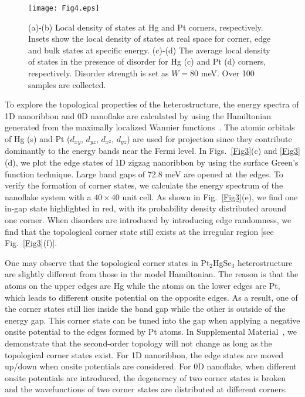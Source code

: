 \documentclass[aps,prl,twocolumn,showpacs,superscriptaddress]{revtex4-1}
\begin{document}
\begin{figure}
  \texttt{[image: Fig4.eps]}
  \caption{(a)-(b) Local density of states at Hg and Pt corners, respectively. Insets show the local density of states at real space for corner, edge and bulk states at specific energy. (c)-(d) The average local density of states in the presence of disorder for Hg (c) and Pt (d) corners, respectively. Disorder strength is set as $W=80$ meV. Over 100 samples are collected.}
  \label{Fig4}
\end{figure}

To explore the topological properties of the heterostructure, the energy spectra of 1D nanoribbon and 0D nanoflake are calculated by using the Hamiltonian generated from the maximally localized Wannier functions~\cite{wannier90}. The atomic orbitals of Hg (s) and Pt ($d_{xy}$, $d_{yz}$, $d_{x^2}$, $d_{yz}$) are used for projection since they contribute dominantly to the energy bands near the Fermi level. In Figs.~\ref{Fig3}(c) and \ref{Fig3}(d), we plot the edge states of 1D zigzag nanoribbon by using the surface Green's function technique. Large band gaps of 72.8 meV are opened at the edges. To verify the formation of corner states, we calculate the energy spectrum of the nanoflake system with a $40\times40$ unit cell. As shown in Fig.~\ref{Fig3}(e), we find one in-gap state highlighted in red, with its probability density distributed around one corner. When disorders are introduced by introducing edge randomness, we find that the topological corner state still exists at the irregular region [see Fig.~\ref{Fig3}(f)].

One may observe that the topological corner states in Pt$_2$HgSe$_3$ heterostructure are slightly different from those in the model Hamiltonian. The reason is that the atoms on the upper edges are Hg while the atoms on the lower edges are Pt, which leads to different onsite potential on the opposite edges.
As a result, one of the corner states still lies inside the band gap while the other is outside of the energy gap. This corner state can be tuned into the gap when applying a negative onsite potential to the edges formed by Pt atoms.
In Supplemental Material~\cite{SM}, we demonstrate that the second-order topology will not change as long as the topological corner states exist. For 1D nanoribbon, the edge states are moved up/down when onsite potentials are considered. For 0D nanoflake, when different onsite potentials are introduced, the degeneracy of two corner states is broken and the wavefunctions of two corner states are distributed at different corners.
\end{document}
